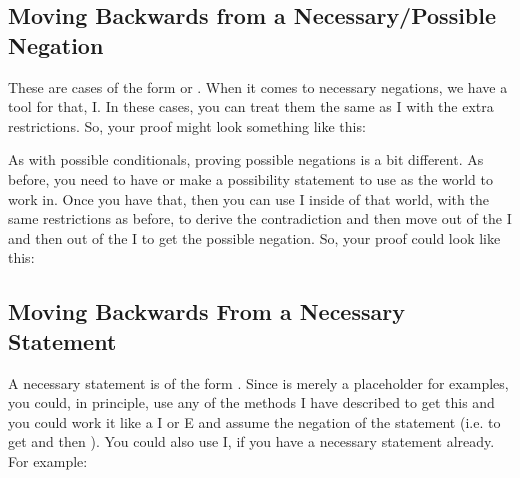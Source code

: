 \subsection{Moving Backwards from a Necessary/Possible Negation}

These are cases of the form \ebox \enot {} or \ediamond \enot {}. When it comes to necessary negations, we have a tool for that, \ebox \enot I. In these cases, you can treat them the same as \enot I with the extra restrictions. So, your proof might look something like this: 
\begin{fitchproof}
\ellipsesline
{}
\open
{}
\ellipsesline
{}
\close
{}
\end{fitchproof}

As with possible conditionals, proving possible negations is a bit different. As before, you need to have or make a possibility statement to use as the world to work in. Once you have that, then you can use \enot I inside of that world, with the same restrictions as before, to derive the contradiction and then move out of the \enot I and then out of the \ediamond I to get the possible negation. So, your proof could look like this: 
\begin{fitchproof}
\ellipsesline
{}			
\open
{}
\open
{}
\ellipsesline
{}
\close
{}
\close
{}
\end{fitchproof}
		
\subsection{Moving Backwards From a Necessary Statement}

A necessary statement is of the form \ebox {}. Since  is merely a placeholder for examples, you could, in principle, use any of the methods I have described to get this and you could work it like a \enot I or \enot E and assume the negation of the statement (i.e. \enot {} to get \ebox \enot \enot {} and then \ebox {}). You could also use \ebox I, if you have a necessary statement already. For example:

\begin{fitchproof}
\ellipsesline
{}			
\open
{}
\have[]{}{}
\ellipsesline
{}
\close
{}
\end{fitchproof}

